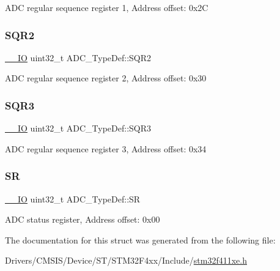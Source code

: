 A\+DC regular sequence register 1, Address offset\+: 0x2C \mbox{\label{struct_a_d_c___type_def_a6b6e55e6c667042e5a46a76518b73d5a}} 
\subsubsection{\texorpdfstring{S\+Q\+R2}{SQR2}}
{\footnotesize\ttfamily \hyperlink{core__sc300_8h_aec43007d9998a0a0e01faede4133d6be}{\+\_\+\+\_\+\+IO} uint32\+\_\+t A\+D\+C\+\_\+\+Type\+Def\+::\+S\+Q\+R2}

A\+DC regular sequence register 2, Address offset\+: 0x30 \mbox{\label{struct_a_d_c___type_def_a51dbdba74c4d3559157392109af68fc6}} 
\subsubsection{\texorpdfstring{S\+Q\+R3}{SQR3}}
{\footnotesize\ttfamily \hyperlink{core__sc300_8h_aec43007d9998a0a0e01faede4133d6be}{\+\_\+\+\_\+\+IO} uint32\+\_\+t A\+D\+C\+\_\+\+Type\+Def\+::\+S\+Q\+R3}

A\+DC regular sequence register 3, Address offset\+: 0x34 \mbox{\label{struct_a_d_c___type_def_a9745df96e98f3cdc2d05ccefce681f64}} 
\subsubsection{\texorpdfstring{SR}{SR}}
{\footnotesize\ttfamily \hyperlink{core__sc300_8h_aec43007d9998a0a0e01faede4133d6be}{\+\_\+\+\_\+\+IO} uint32\+\_\+t A\+D\+C\+\_\+\+Type\+Def\+::\+SR}

A\+DC status register, Address offset\+: 0x00 

The documentation for this struct was generated from the following file\+:\begin{DoxyCompactItemize}
\item 
Drivers/\+C\+M\+S\+I\+S/\+Device/\+S\+T/\+S\+T\+M32\+F4xx/\+Include/\hyperlink{stm32f411xe_8h}{stm32f411xe.\+h}\end{DoxyCompactItemize}
